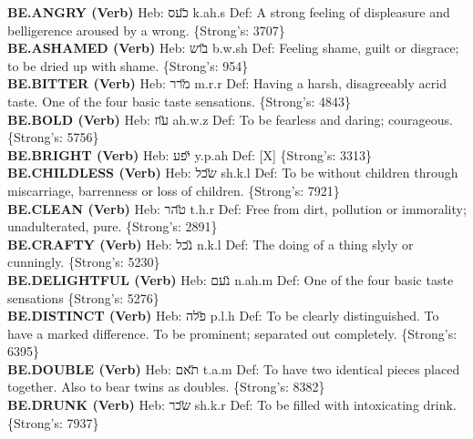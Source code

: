 {\textbf{BE.ANGRY (Verb)} Heb: {\large\H כעס} k.ah.s Def: A strong feeling of displeasure and belligerence aroused by a wrong. \{Strong's: 3707\}\hfill{}\\

\textbf{BE.ASHAMED (Verb)} Heb: {\large\H בוש} b.w.sh Def: Feeling shame, guilt or disgrace; to be dried up with shame. \{Strong's: 954\}\hfill{}\\

\textbf{BE.BITTER (Verb)} Heb: {\large\H מרר} m.r.r Def: Having a harsh, disagreeably acrid taste. One of the four basic taste sensations. \{Strong's: 4843\}\hfill{}\\

\textbf{BE.BOLD (Verb)} Heb: {\large\H עוז} ah.w.z Def: To be fearless and daring; courageous. \{Strong's: 5756\}\hfill{}\\

\textbf{BE.BRIGHT (Verb)} Heb: {\large\H יפע} y.p.ah Def: {[}X{]} \{Strong's: 3313\}\hfill{}\\

\textbf{BE.CHILDLESS (Verb)} Heb: {\large\H שכל} sh.k.l Def: To be without children through miscarriage, barrenness or loss of children. \{Strong's: 7921\}\hfill{}\\

\textbf{BE.CLEAN (Verb)} Heb: {\large\H טהר} t.h.r Def: Free from dirt, pollution or immorality; unadulterated, pure. \{Strong's: 2891\}\hfill{}\\

\textbf{BE.CRAFTY (Verb)} Heb: {\large\H נכל} n.k.l Def: The doing of a thing slyly or cunningly. \{Strong's: 5230\}\hfill{}\\

\textbf{BE.DELIGHTFUL (Verb)} Heb: {\large\H נעם} n.ah.m Def: One of the four basic taste sensations \{Strong's: 5276\}\hfill{}\\

\textbf{BE.DISTINCT (Verb)} Heb: {\large\H פלה} p.l.h Def: To be clearly distinguished. To have a marked difference. To be prominent; separated out completely. \{Strong's: 6395\}\hfill{}\\

\textbf{BE.DOUBLE (Verb)} Heb: {\large\H תאם} t.a.m Def: To have two identical pieces placed together. Also to bear twins as doubles. \{Strong's: 8382\}\hfill{}\\

\textbf{BE.DRUNK (Verb)} Heb: {\large\H שכר} sh.k.r Def: To be filled with intoxicating drink. \{Strong's: 7937\}\hfill{}\\

}
